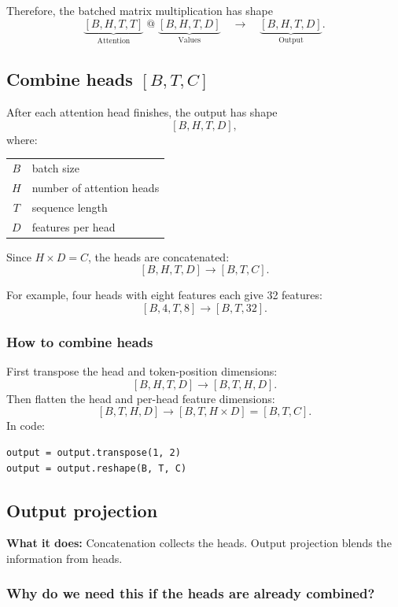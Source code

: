 Therefore, the batched matrix multiplication has shape
\[
  \underbrace{[B,H,T,T]}_{\text{Attention}}
  \;@\;
  \underbrace{[B,H,T,D]}_{\text{Values}}
  \quad\longrightarrow\quad
  \underbrace{[B,H,T,D]}_{\text{Output}}.
\]

\subsection{Combine heads \( [B,T,C] \)}

After each attention head finishes, the output has shape
\[
  [B,H,T,D],
\]
where:
\begin{center}
\begin{tabular}{@{}cl@{}}
  \(B\) & batch size \\
  \(H\) & number of attention heads \\
  \(T\) & sequence length \\
  \(D\) & features per head
\end{tabular}
\end{center}

Since \(H\times D=C\), the heads are concatenated:
\[
  [B,H,T,D] \longrightarrow [B,T,C].
\]

For example, four heads with eight features each give 32 features:
\[
  [B,4,T,8] \longrightarrow [B,T,32].
\]

\subsubsection*{How to combine heads}

First transpose the head and token-position dimensions:
\[
  [B,H,T,D]\longrightarrow[B,T,H,D].
\]
Then flatten the head and per-head feature dimensions:
\[
  [B,T,H,D]\longrightarrow[B,T,H\times D]=[B,T,C].
\]
In code:
\begin{lstlisting}[style=shadedpython]
output = output.transpose(1, 2)
output = output.reshape(B, T, C)
\end{lstlisting}

\subsection{Output projection}

\textbf{What it does:} Concatenation collects the heads. Output projection blends the information from heads.

\subsubsection*{Why do we need this if the heads are already combined?}

